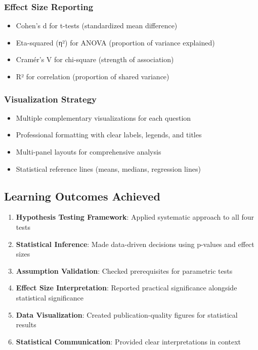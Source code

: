 \documentclass[11pt]{article}
\providecommand{\tightlist}{%
      \setlength{\itemsep}{0pt}\setlength{\parskip}{0pt}}
\begin{document}
\subsubsection{Effect Size Reporting}\label{effect-size-reporting}

\begin{itemize}
\tightlist
\item
  Cohen's d for t-tests (standardized mean difference)
\item
  Eta-squared (η²) for ANOVA (proportion of variance explained)
\item
  Cramér's V for chi-square (strength of association)
\item
  R² for correlation (proportion of shared variance)
\end{itemize}

\subsubsection{Visualization Strategy}\label{visualization-strategy}

\begin{itemize}
\tightlist
\item
  Multiple complementary visualizations for each question
\item
  Professional formatting with clear labels, legends, and titles
\item
  Multi-panel layouts for comprehensive analysis
\item
  Statistical reference lines (means, medians, regression lines)
\end{itemize}

\subsection{Learning Outcomes
Achieved}\label{learning-outcomes-achieved}

\begin{enumerate}
\def\labelenumi{\arabic{enumi}.}
\tightlist
\item
  \textbf{Hypothesis Testing Framework}: Applied systematic approach to
  all four tests
\item
  \textbf{Statistical Inference}: Made data-driven decisions using
  p-values and effect sizes
\item
  \textbf{Assumption Validation}: Checked prerequisites for parametric
  tests
\item
  \textbf{Effect Size Interpretation}: Reported practical significance
  alongside statistical significance
\item
  \textbf{Data Visualization}: Created publication-quality figures for
  statistical results
\item
  \textbf{Statistical Communication}: Provided clear interpretations in
  context
\end{enumerate}
\end{document}
